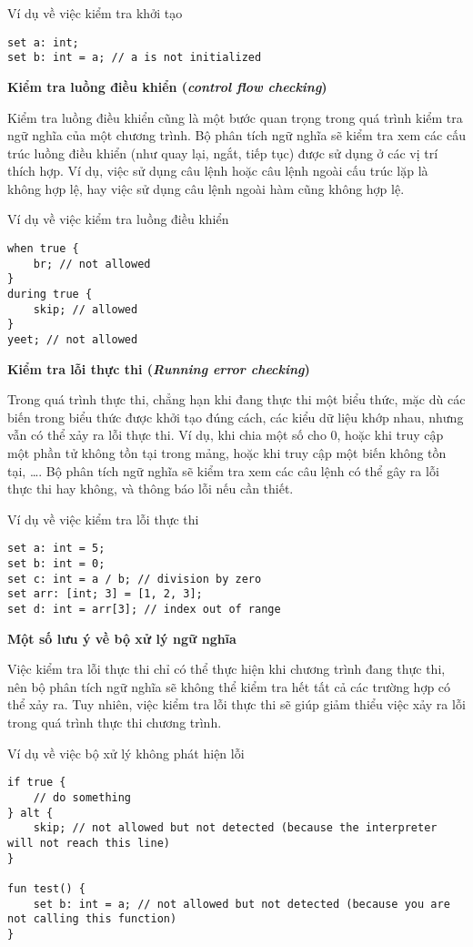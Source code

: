 \noindent Ví dụ về việc kiểm tra khởi tạo
\begin{lstlisting}[]
set a: int;
set b: int = a; // a is not initialized
\end{lstlisting}

\noindent \textbf{Kiểm tra luồng điều khiển (\textit{control flow checking})}

    Kiểm tra luồng điều khiển cũng là một bước quan trọng trong quá trình kiểm tra ngữ nghĩa của một chương trình. Bộ phân tích ngữ nghĩa sẽ kiểm tra xem các cấu trúc luồng điều khiển (như quay lại, ngắt, tiếp tục) được sử dụng ở các vị trí thích hợp. Ví dụ, việc sử dụng câu lệnh  hoặc câu lệnh  ngoài cấu trúc lặp là không hợp lệ, hay việc sử dụng câu lệnh  ngoài hàm cũng không hợp lệ.

\noindent Ví dụ về việc kiểm tra luồng điều khiển
\begin{lstlisting}[]
when true {
    br; // not allowed
}
during true {
    skip; // allowed
}
yeet; // not allowed
\end{lstlisting}

\noindent \textbf{Kiểm tra lỗi thực thi (\textit{Running error checking})}

    Trong quá trình thực thi, chẳng hạn khi đang thực thi một biểu thức, mặc dù các biến trong biểu thức được khởi tạo đúng cách, các kiểu dữ liệu khớp nhau, nhưng vẫn có thể xảy ra lỗi thực thi. Ví dụ, khi chia một số cho 0, hoặc khi truy cập một phần tử không tồn tại trong mảng, hoặc khi truy cập một biến không tồn tại, \dots. Bộ phân tích ngữ nghĩa sẽ kiểm tra xem các câu lệnh có thể gây ra lỗi thực thi hay không, và thông báo lỗi nếu cần thiết. 

\noindent Ví dụ về việc kiểm tra lỗi thực thi
\begin{lstlisting}[]
set a: int = 5;
set b: int = 0;
set c: int = a / b; // division by zero
set arr: [int; 3] = [1, 2, 3];
set d: int = arr[3]; // index out of range
\end{lstlisting}

\noindent \textbf{Một số lưu ý về bộ xử lý ngữ nghĩa}

    Việc kiểm tra lỗi thực thi chỉ có thể thực hiện khi chương trình đang thực thi, nên bộ phân tích ngữ nghĩa sẽ không thể kiểm tra hết tất cả các trường hợp có thể xảy ra. Tuy nhiên, việc kiểm tra lỗi thực thi sẽ giúp giảm thiểu việc xảy ra lỗi trong quá trình thực thi chương trình.

\noindent Ví dụ về việc bộ xử lý không phát hiện lỗi
\begin{lstlisting}[]
if true {
    // do something
} alt {
    skip; // not allowed but not detected (because the interpreter will not reach this line)
}

fun test() {
    set b: int = a; // not allowed but not detected (because you are not calling this function)
}
\end{lstlisting}

